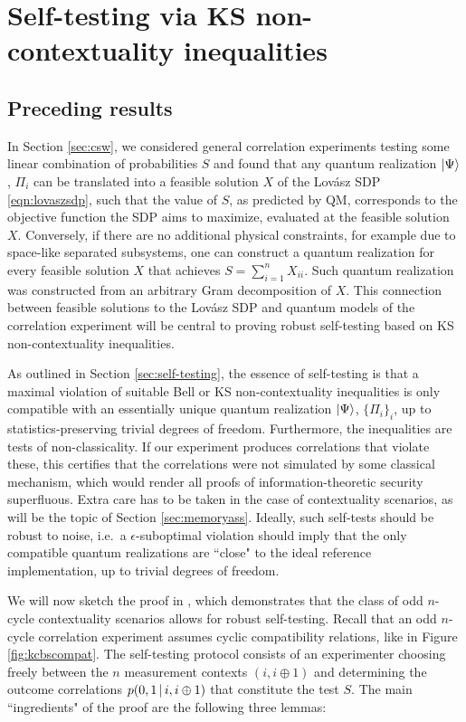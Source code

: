 \chapter{Self-testing via KS non-contextuality inequalities}
\label{sec:contselftesting}

\section{Preceding results}

In Section \ref{sec:csw}, we considered general correlation experiments testing some linear combination of probabilities $S$ and found that any quantum realization $\ket{\Psi}$, $\Pi_i$ can be translated into a feasible solution $X$ of the Lovász SDP \ref{eqn:lovaszsdp}, such that the value of $S$, as predicted by QM, corresponds to the objective function the SDP aims to maximize, evaluated at the feasible solution $X$. Conversely, if there are no additional physical constraints, for example due to space-like separated subsystems, one can construct a quantum realization for every feasible solution $X$ that achieves $S=\sum_{i=1}^n X_{ii}$. Such quantum realization was constructed from an arbitrary Gram decomposition of $X$. This connection between feasible solutions to the Lovász SDP and quantum models of the correlation experiment will be central to proving robust self-testing based on KS non-contextuality inequalities.

As outlined in Section \ref{sec:self-testing}, the essence of self-testing is that a maximal violation of suitable Bell or KS non-contextuality inequalities is only compatible with an essentially unique quantum realization $\ket{\Psi}$, $\{\Pi_i\}_i$, up to statistics-preserving trivial degrees of freedom. Furthermore, the inequalities are tests of non-classicality. If our experiment produces correlations that violate these, this certifies that the correlations were not simulated by some classical mechanism, which would render all proofs of information-theoretic security superfluous. Extra care has to be taken in the case of contextuality scenarios, as will be the topic of Section \ref{sec:memoryass}. Ideally, such self-tests should be robust to noise, i.e.\ a $\epsilon$-suboptimal violation should imply that the only compatible quantum realizations are ``close" to the ideal reference implementation, up to trivial degrees of freedom.

We will now sketch the proof in \cite{Bharti2019}, which demonstrates that the class of odd $n$-cycle contextuality scenarios allows for robust self-testing. Recall that an odd $n$-cycle correlation experiment assumes cyclic compatibility relations, like in Figure \ref{fig:kcbscompat}. The self-testing protocol consists of an experimenter choosing freely between the $n$ measurement contexts $(i,i\oplus1)$ and determining the outcome correlations $p(0,1\thinspace\vert\thinspace i,i\oplus 1)$ that constitute the test $S$. The main ``ingredients" of the proof are the following three lemmas:

